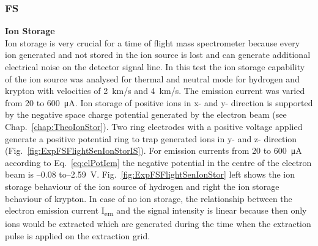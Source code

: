		\subsubsection{FS }\label{chap:FSCalib}
		\textbf{Ion Storage}\\
		Ion storage is very crucial for a time of flight mass spectrometer because every ion generated and not stored in the ion source is lost and can generate additional electrical noise on the detector signal line. In this test the ion storage capability of the ion source was analysed for thermal and neutral mode for hydrogen and krypton with velocities of 2~km/s and 4~km/s. The emission current was varied from 20 to 600~\si{\micro\ampere}. Ion storage of positive ions in x- and y- direction is supported by the negative space charge potential generated by the electron beam (see Chap.~\ref{chap:TheoIonStor}). Two ring electrodes with a positive voltage applied generate a positive potential ring to trap generated ions in y- and z- direction (Fig.~\ref{fig:ExpFSFlightSenIonStorIS}). For emission currents from 20 to 600~\si{\micro\ampere} according to Eq.~\eqref{eq:elPotIem} the negative potential in the centre of the electron beam is --0.08 to--2.59~\si{\volt}. Fig.~\ref{fig:ExpFSFlightSenIonStor} left shows the ion storage behaviour of the ion source of hydrogen and right the ion storage behaviour of krypton. In case of no ion storage, the relationship between the electron emission current I\textsubscript{em} and the signal intensity is linear because then only ions would be extracted which are generated during the time when the extraction pulse is applied on the extraction grid.
		
